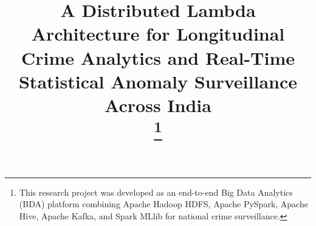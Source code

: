 \documentclass[conference]{IEEEtran}
\begin{document}
\title{A Distributed Lambda Architecture for Longitudinal Crime Analytics and Real-Time Statistical Anomaly Surveillance Across India\\
\thanks{This research project was developed as an end-to-end Big Data Analytics (BDA) platform combining Apache Hadoop HDFS, Apache PySpark, Apache Hive, Apache Kafka, and Spark MLlib for national crime surveillance.}
}

\author{
\and
{}
\and
{}
}

\maketitle
\end{document}
